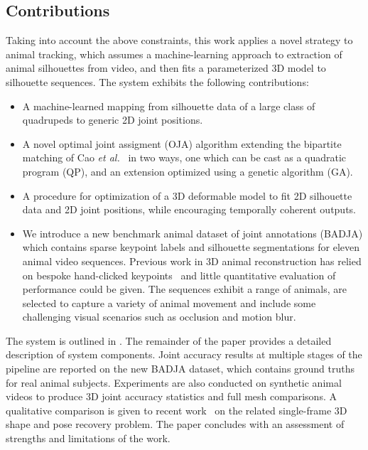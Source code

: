 \subsection{Contributions}
Taking into account the above constraints, this work applies a novel strategy to animal tracking, which assumes a machine-learning approach to extraction of animal silhouettes from video, and then fits a parameterized 3D model to silhouette sequences.  The system exhibits the following contributions:
\begin{itemize}
\item A machine-learned mapping from silhouette data of a large class of quadru\-peds to generic 2D joint positions.
\item A novel optimal joint assigment (OJA) algorithm extending the bipartite matching of Cao {\em et al.}~\cite{cao2017realtime} in two ways, one which can be cast as a quadratic program (QP), and an extension optimized using a genetic algorithm (GA).
\item A procedure for optimization of a 3D deformable model to fit 2D silhouette data and 2D joint positions, while encouraging temporally coherent outputs.
\item We introduce a new benchmark animal dataset of joint annotations (BADJA) which contains sparse keypoint labels and silhouette segmentations for eleven animal video sequences. 
Previous work in 3D animal reconstruction has relied on bespoke hand-clicked keypoints~\cite{zuffi2017menagerie,zuffi_lions} and little quantitative evaluation of performance could be given.
The sequences exhibit a range of animals, are selected to capture a variety of animal movement and include some challenging visual scenarios such as occlusion and motion blur.
\end{itemize}
The system is outlined in .  The remainder of the paper provides a detailed description of system components.  Joint accuracy results at multiple stages of the pipeline are reported on the new BADJA dataset, which contains ground truths for real animal subjects. Experiments are also conducted on synthetic animal videos to produce 3D joint accuracy statistics and full mesh comparisons. A qualitative comparison is given to recent work~\cite{zuffi2017menagerie} on the related single-frame 3D shape and pose recovery problem. The paper concludes with an assessment of strengths and limitations of the work.



